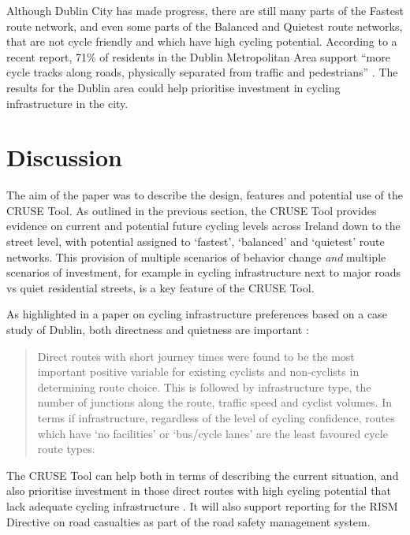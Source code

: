\documentclass[
  super,
  preprint,
  3p]{elsarticle}
\begin{document}
Although Dublin City has made progress, there are still many parts of
the Fastest route network, and even some parts of the Balanced and
Quietest route networks, that are not cycle friendly and which have high
cycling potential. According to a recent report, 71\% of residents in
the Dublin Metropolitan Area support ``more cycle tracks along roads,
physically separated from traffic and pedestrians'' \citep{walking2021}.
The results for the Dublin area could help prioritise investment in
cycling infrastructure in the city.

\hypertarget{sec-discussion}{%
\section{Discussion}\label{sec-discussion}}

The aim of the paper was to describe the design, features and potential
use of the CRUSE Tool. As outlined in the previous section, the CRUSE
Tool provides evidence on current and potential future cycling levels
across Ireland down to the street level, with potential assigned to
`fastest', `balanced' and `quietest' route networks. This provision of
multiple scenarios of behavior change \emph{and} multiple scenarios of
investment, for example in cycling infrastructure next to major roads vs
quiet residential streets, is a key feature of the CRUSE Tool.

As highlighted in a paper on cycling infrastructure preferences based on
a case study of Dublin, both directness and quietness are important
\citep{caulfield2012}:

\begin{quote}
Direct routes with short journey times were found to be the most
important positive variable for existing cyclists and non-cyclists in
determining route choice. This is followed by infrastructure type, the
number of junctions along the route, traffic speed and cyclist volumes.
In terms if infrastructure, regardless of the level of cycling
confidence, routes which have `no facilities' or `bus/cycle lanes' are
the least favoured cycle route types.
\end{quote}

The CRUSE Tool can help both in terms of describing the current
situation, and also prioritise investment in those direct routes with
high cycling potential that lack adequate cycling infrastructure
\citep{caulfield2012}. It will also support reporting for the RISM
Directive on road casualties as part of the road safety management
system.
\end{document}

